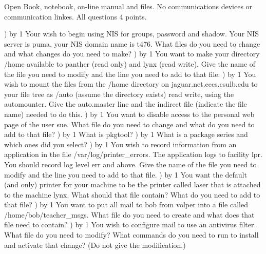 
\parindent=0in
\nopagenumbers
\newcount\quesno
{}
\def\ques{\number\quesno) \advance\quesno by 1}
\def\aspace{\vskip 1.5in}

Open Book, notebook, on-line manual and files.
No communications devices or communication linkes.
All questions 4 points.

\ques
Your wish to begin using NIS for groups, password and shadow.
Your NIS server is {\ltt{}puma}, your NIS domain name is {\ltt{}t476}.
What files do you need to change and what changes do you need to make?
\vskip 1.8in
\ques
You want to make your directory
{\ltt{}/home}
available to panther (read only) and lynx (read write).
Give the name of the file you need to modify and the line you need to
add to that file.
\vskip 1.2in
\ques
You wish to mount the files from the
{\ltt{}/home} directory on {\ltt{}jaguar.net.cecs.csulb.edu}
to your file tree as {\ltt{}/auto} (assume the directory exists) read write,
using the automounter.
Give the {\ltt{}auto.master} line and the indirect file (indicate the file name)
needed to do this.
\vskip 1.2in
\ques
You want to disable access to the personal web page of the
user {\ltt{}sue}.
What file do you need to change and what do you need to add to that file?
\vskip 2.2in
\vfill\eject
\ques
What is {\ltt{}pkgtool}?
\vskip 0.9in
\ques
What is a package series and which ones did you select?
\vskip 1.2in
\ques
You wish to record information
from an application
in the file {\ltt{}/var/log/printer_errors}.
The application logs to facility {\ltt{}lpr}.
You should record log level {\ltt{}err} and above.
Give the name of the file you need to modify and the line you need to
add to that file.
\vskip 1.4in
\ques
You want the default (and only) printer for your machine to be the printer
called {\ltt{}laser} that is attached to the machine {\ltt{}lynx}.
What should that file contain?
What do you need to add to that file?
\vskip 1.0in
\ques
You want to put all mail to {\ltt{}bob} from {\ltt{}volper}
into a file called {\ltt{}/home/bob/teacher_msgs}.
What file do you need to create and what does that file need to contain?
\vskip 1.8in
\vfill\eject
\ques
You wish to configure mail to use an antivirus filter.
What file do you need to modify?
What commands do you need to run to install and activate that change?
(Do not give the modification.)
